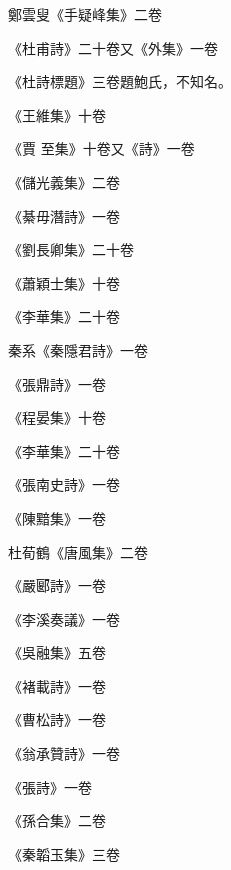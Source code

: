 \begin{pinyinscope}
 鄭雲叟《手疑峰集》二卷



 《杜甫詩》二十卷又《外集》一卷



 《杜詩標題》三卷題鮑氏，不知名。



 《王維集》十卷



 《賈
 至集》十卷又《詩》一卷



 《儲光義集》二卷



 《綦毋潛詩》一卷



 《劉長卿集》二十卷



 《蕭穎士集》十卷



 《李華集》二十卷



 秦系《秦隱君詩》一卷



 《張鼎詩》一卷



 《程晏集》十卷



 《李華集》二十卷



 《張南史詩》一卷



 《陳黯集》一卷



 杜荀鶴《唐風集》二卷



 《嚴郾詩》一卷



 《李溪奏議》一卷



 《吳融集》五卷



 《褚載詩》一卷



 《曹松詩》一卷



 《翁承贊詩》一卷



 《張詩》一卷



 《孫合集》二卷



 《秦韜玉集》三卷




\end{pinyinscope}
